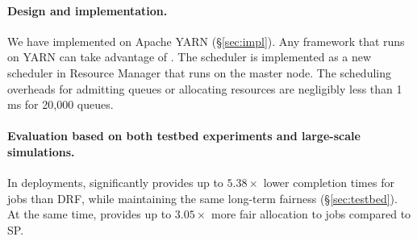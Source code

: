 
\paragraph{Design and implementation.} 
We have implemented \name on Apache YARN \cite{yarn} (\S\ref{sec:impl}).
Any framework that runs on YARN can take advantage of \name.
The \name scheduler is implemented as a new scheduler in Resource Manager that runs on the master node.
The scheduling overheads for admitting queues or allocating resources are negligibly less than 1 ms for 20,000 queues.


%

\paragraph{Evaluation based on both testbed experiments and large-scale simulations.}
In deployments, \name significantly provides up to $5.38\times$ lower completion times for \burstq jobs than DRF, while maintaining the same long-term fairness (\S\ref{sec:testbed}). 
At the same time, \name provides up to $3.05\times$ more fair allocation to {\batchq} jobs compared to SP.

